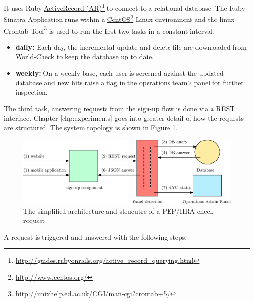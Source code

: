 \documentclass[a4paper, oneside]{csthesis}
\newcommand\fnurl[2]{%
  \href{#2}{#1}\footnote{\url{#2}}%
}
\begin{document}
It uses Ruby \fnurl{ActiveRecord (AR)}{http://guides.rubyonrails.org/active_record_querying.html} to connect to a relational database. The Ruby Sinatra Application runs within a \fnurl{CentOS}{http://www.centos.org/} Linux environment and the linux \fnurl{Crontab Tool}{http://unixhelp.ed.ac.uk/CGI/man-cgi?crontab+5/} is used to run the first two tasks in a constant interval:
\begin{itemize}
\item \textbf{daily:} Each day, the incremental update and delete file are downloaded from World-Check to keep the database up to date.
\item \textbf{weekly:} On a weekly base, each user is screened against the updated database and new hits raise a flag in the operations team's panel for further inspection.
\end{itemize}

The third task, answering requests from the sign-up flow is done via a REST interface. Chapter \ref{chp:experiments} goes into greater detail of how the requests are structured. The system topology is shown in Figure \ref{fig:fraud-arch}.

\begin{figure}[tb]
    \begin{center}
        \includegraphics[width=\textwidth]{figures/fraud-arch2.eps}
    \end{center}
    \caption{The simplified architecture and strucutre of a PEP/HRA check request}
    \label{fig:fraud-arch}
\end{figure}

A request is triggered and answered with the following steps:
\end{document}
